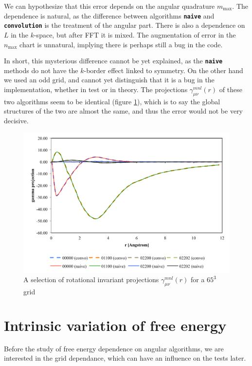 We can hypothesize that this error depends on the angular
quadrature $m_{\max}$. The dependence is natural, as the difference
between algorithms \texttt{\textbf{naive}} and \texttt{\textbf{convolution}}
is the treatment of the angular part. There is also a dependence on
$L$ in the $k$-space, but after \acs{FFT} it is mixed. The augmentation
of error in the $n_{\max}$ chart is unnatural, implying there is
perhaps still a bug in the code.

In short, this mysterious difference cannot be yet explained, as
the \texttt{\textbf{naive}} methods do not have the $k$-border
effect linked to symmetry. On the other hand we used an odd grid, and
cannot yet distinguish that it is a bug in the implementation,
whether in test or in theory. The projections $\gamma_{\mu\nu}^{mnl}(r)$
of these two algorithms seem to be identical (figure \ref{fig:gamma-proj}),
which is to say the global structures of the two are almost
the same, and thus the error would not be very decisive.

\begin{figure}[h]
\begin{centering}
\includegraphics[width=0.65\columnwidth]{_figure/results/gamma_proj}
\par\end{centering}
\caption{A selection of rotational invariant projections $\gamma_{\mu\nu}^{mnl}(r)$
for a $65^{3}$ grid\label{fig:gamma-proj}}
\end{figure}


\section{Intrinsic variation of free energy\label{sec:Intrinsic-variation-of}}

Before the study of free energy dependence on angular algorithms, we are
interested in the grid dependance, which can have an influence on the
tests later.

